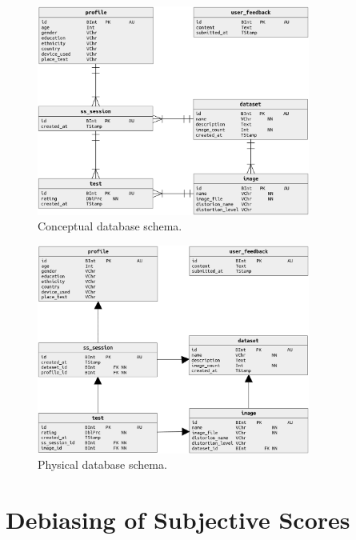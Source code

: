 \begin{figure}
    \centering
    \includegraphics[width=0.8\textwidth]{images/db_conceptual.png}
    \caption{Conceptual database schema.}\label{fig:db_conceptual}
\end{figure}

\begin{figure}
    \centering
    \includegraphics[width=0.8\textwidth]{images/db_physical.png}
    \caption{Physical database schema.}\label{fig:db_physical}
\end{figure}


\section{Debiasing of Subjective Scores}

